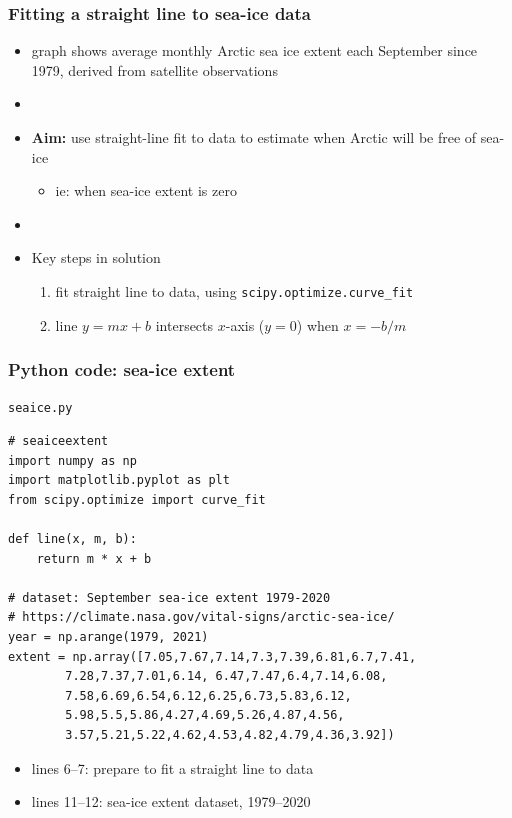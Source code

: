 \documentclass[english,14pt]{beamer}
\begin{document}
\begin{frame}[fragile]

\frametitle{Fitting a straight line to sea-ice data}

\begin{itemize}
	\item graph shows average monthly Arctic sea ice extent each September since 1979, derived from satellite observations
	\item[]
	\item[] \textbf{Aim:} use straight-line fit to data to estimate when Arctic will be free of sea-ice
	\begin{itemize}
		\item ie: when sea-ice extent is zero
	\end{itemize}
	\item[]
	\item Key steps in solution
	\begin{enumerate}
		\item fit straight line to data, using \texttt{scipy.optimize.curve\_fit}
		\item line $y = mx + b$ intersects $x$-axis ($y=0$) when $x = -b/m$
	\end{enumerate}
\end{itemize}

\end{frame}


\begin{frame}[fragile]

\frametitle{Python code: sea-ice extent}

\vspace*{-3mm}

\texttt{seaice.py}
\begin{lstlisting}[style=CStyle,basicstyle=\scriptsize]
# seaiceextent
import numpy as np
import matplotlib.pyplot as plt
from scipy.optimize import curve_fit

def line(x, m, b):
    return m * x + b

# dataset: September sea-ice extent 1979-2020
# https://climate.nasa.gov/vital-signs/arctic-sea-ice/
year = np.arange(1979, 2021)
extent = np.array([7.05,7.67,7.14,7.3,7.39,6.81,6.7,7.41,
        7.28,7.37,7.01,6.14, 6.47,7.47,6.4,7.14,6.08,
        7.58,6.69,6.54,6.12,6.25,6.73,5.83,6.12,
        5.98,5.5,5.86,4.27,4.69,5.26,4.87,4.56,
        3.57,5.21,5.22,4.62,4.53,4.82,4.79,4.36,3.92])
\end{lstlisting}

\begin{itemize}
	\item lines 6--7: prepare to fit a straight line to data
	\item lines 11--12: sea-ice extent dataset, 1979--2020
\end{itemize}

\end{frame}
\end{document}

